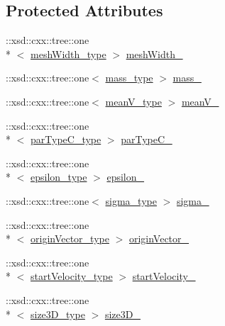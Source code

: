 \subsection*{Protected Attributes}
\begin{DoxyCompactItemize}
\item 
\-::xsd\-::cxx\-::tree\-::one\\*
$<$ \hyperlink{classcuboid__t_a5759759b1b9e3029ff36c7f20d9213dc}{mesh\-Width\-\_\-type} $>$ \hyperlink{classcuboid__t_af31779bcbd1ff3844623c658f633a8aa}{mesh\-Width\-\_\-}
\item 
\-::xsd\-::cxx\-::tree\-::one$<$ \hyperlink{classcuboid__t_a365536fb1db29c6ef0da234297763d61}{mass\-\_\-type} $>$ \hyperlink{classcuboid__t_a9c7dd176b3732eb61362f104fe51e4b8}{mass\-\_\-}
\item 
\-::xsd\-::cxx\-::tree\-::one$<$ \hyperlink{classcuboid__t_aea1381b8b1cca3f677ae4a28b29cbe2a}{mean\-V\-\_\-type} $>$ \hyperlink{classcuboid__t_a3d83a46d242a523fb10095e9025abddf}{mean\-V\-\_\-}
\item 
\-::xsd\-::cxx\-::tree\-::one\\*
$<$ \hyperlink{classcuboid__t_a162caafd069fa127809bb2d573c752c5}{par\-Type\-C\-\_\-type} $>$ \hyperlink{classcuboid__t_a0ce3a150a7054afaab0b4cfb600b5920}{par\-Type\-C\-\_\-}
\item 
\-::xsd\-::cxx\-::tree\-::one\\*
$<$ \hyperlink{classcuboid__t_ac4a981a7963b1b2105d448cf42ab1230}{epsilon\-\_\-type} $>$ \hyperlink{classcuboid__t_a89f568a5a27be873e0f482d708e31e3d}{epsilon\-\_\-}
\item 
\-::xsd\-::cxx\-::tree\-::one$<$ \hyperlink{classcuboid__t_ae1de9c7b1d2b2a9098de31c546c0ff83}{sigma\-\_\-type} $>$ \hyperlink{classcuboid__t_ad68ee2b884c2bdec543177f9b2027021}{sigma\-\_\-}
\item 
\-::xsd\-::cxx\-::tree\-::one\\*
$<$ \hyperlink{classcuboid__t_a20d67505efc00dc82947ce881aec1e76}{origin\-Vector\-\_\-type} $>$ \hyperlink{classcuboid__t_aa74b198d17ccc0d095655adf9cfa312b}{origin\-Vector\-\_\-}
\item 
\-::xsd\-::cxx\-::tree\-::one\\*
$<$ \hyperlink{classcuboid__t_a7b9bd2a7888abc4b08f6f4e91ac9a81f}{start\-Velocity\-\_\-type} $>$ \hyperlink{classcuboid__t_a0720684b94609a0c60088e2535cc2c67}{start\-Velocity\-\_\-}
\item 
\-::xsd\-::cxx\-::tree\-::one\\*
$<$ \hyperlink{classcuboid__t_abf130ab4ed6d70047bb193a41283ec28}{size3\-D\-\_\-type} $>$ \hyperlink{classcuboid__t_afccbf21e84c29d7cc05cadf8d5945856}{size3\-D\-\_\-}
\end{DoxyCompactItemize}



